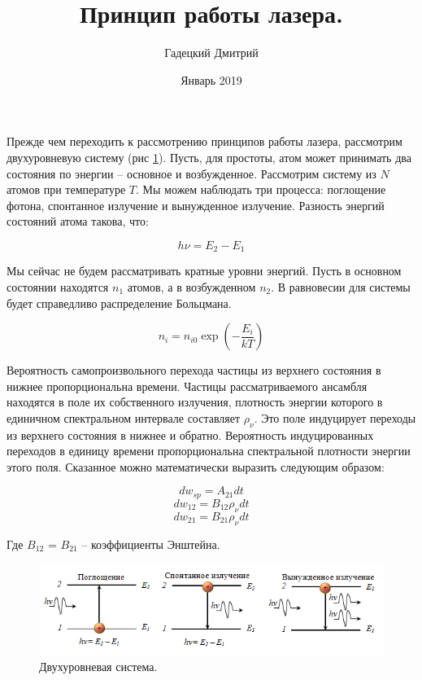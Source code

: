 \documentclass[a4paper,12pt]{article}
\title{Принцип работы лазера.}
\author{Гадецкий Дмитрий}
\date{Январь 2019}
\theoremstyle{plain} %
\theoremstyle{definition} %
\theoremstyle{remark} %
\begin{document}
\maketitle
\thispagestyle{empty}
\newpage	 
Прежде чем переходить к рассмотрению принципов работы лазера, рассмотрим двухуровневую систему (рис \ref{fig:2sistem}). Пусть, для простоты, атом может принимать два состояния по энергии -- основное и возбужденное.
Рассмотрим систему из $N$ атомов при температуре $T$. 
Мы можем наблюдать три процесса: поглощение фотона, спонтанное излучение и вынужденное излучение. Разность энергий состояний атома такова, что:

\begin{equation}
h\nu = E_2-E_1
\label{eq_1}
\end{equation}

Мы сейчас не будем рассматривать кратные уровни энергий.
Пусть в основном состоянии находятся $n_1$ атомов, а в возбужденном $n_2$. В равновесии для системы будет справедливо распределение Больцмана.

\begin{equation}
n_i = n_{i0}\exp(-\frac{E_i}{kT})
\end{equation}

Вероятность самопроизвольного перехода частицы из верхнего состояния в нижнее пропорциональна времени. 
Частицы рассматриваемого ансамбля находятся в поле их собственного излучения, плотность энергии которого в единичном спектральном интервале составляет $\rho_{\nu}$. Это поле индуцирует переходы из верхнего состояния в нижнее и обратно.
Вероятность индуцированных переходов в единицу времени пропорциональна спектральной плотности энергии этого поля. Сказанное можно математически выразить следующим образом:

\begin{equation}
dw_{sp} = A_{21}dt
\end{equation}
\begin{equation}
dw_{12} = B_{12}\rho_{\nu}dt
\end{equation}
\begin{equation}
dw_{21} = B_{21}\rho_{\nu}dt
\end{equation}

Где $B_{12}$ = $B_{21}$ -- коэффициенты Энштейна.

\begin{figure}[h]
	\includegraphics[width=\linewidth]{pict1.png}
	\caption{Двухуровневая система.}
	\label{fig:2sistem}
\end{figure}
\end{document}
